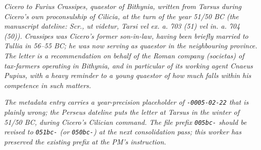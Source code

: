 
\textit{Cicero to Furius Crassipes, quaestor of Bithynia, written
from Tarsus during Cicero's own proconsulship of Cilicia, at the
turn of the year 51/50 BC (the manuscript dateline: \textit{Scr.,
ut videtur, Tarsi vel ex. a. 703 (51) vel in. a. 704 (50)}).
Crassipes was Cicero's former son-in-law, having been briefly
married to Tullia in 56--55 BC; he was now serving as quaestor
in the neighbouring province. The letter is a recommendation on
behalf of the Roman company (\textit{societas}) of tax-farmers
operating in Bithynia, and in particular of its working agent
Cnaeus Pupius, with a heavy reminder to a young quaestor of how
much falls within his competence in such matters.}

\textit{The metadata entry carries a year-precision placeholder
of \texttt{-0005-02-22} that is plainly wrong; the Perseus
dateline puts the letter at Tarsus in the winter of 51/50 BC,
during Cicero's Cilician command. The file prefix
\texttt{005bc-} should be revised to \texttt{051bc-} (or
\texttt{050bc-}) at the next consolidation pass; this worker has
preserved the existing prefix at the PM's instruction.}
